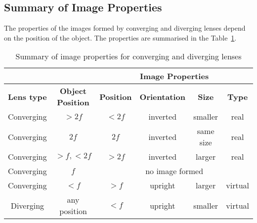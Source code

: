 \subsection{Summary of Image Properties}
The properties of the images formed by converging and diverging lenses depend on the position of the object. The properties are summarised in the Table~\ref{tab:p:wsl:go11:l:summary}.

\begin{table}[htbp]
\begin{center}
\caption{Summary of image properties for converging and diverging lenses}
\label{tab:p:wsl:go11:l:summary}
\begin{tabular}{|c|c|c|c|c|c|}\hline
\multicolumn{2}{|c|}{}&\multicolumn{4}{c|}{\textbf{Image Properties}}\\\hline
\textbf{Lens type} & \textbf{Object Position} & \textbf{Position} & \textbf{Orientation} & \textbf{Size} & \textbf{Type}\\ \hline
Converging & $>2f$ & $<2f$ & inverted & smaller & real\\ \hline
Converging & $2f$ & $2f$ & inverted & same size & real\\ \hline
Converging & $>f,<2f$ & $>2f$ & inverted & larger & real\\ \hline
Converging & $f$ & \multicolumn{4}{c|}{no image formed}\\ \hline
Converging & $<f$ & $>f$ & upright & larger & virtual\\ \hline
Diverging & any position & $<f$ & upright & smaller& virtual\\

\hline
\end{tabular}
\end{center}
\end{table}

\pagebreak
